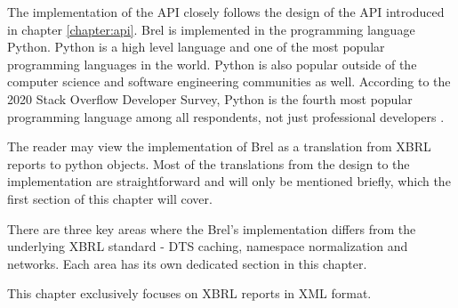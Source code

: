 The implementation of the API closely follows the design of the API introduced in chapter \ref{chapter:api}.
Brel is implemented in the programming language Python.
Python is a high level language and one of the most popular programming languages in the world.
Python is also popular outside of the computer science and software engineering communities as well.
According to the 2020 Stack Overflow Developer Survey, Python is the fourth most popular programming language among all respondents, 
not just professional developers \cite{stack_overflow_2020}.

The reader may view the implementation of Brel as a translation from XBRL reports to python objects.
Most of the translations from the design to the implementation are straightforward and will only be mentioned briefly, 
which the first section of this chapter will cover.

There are three key areas where the Brel's implementation differs from the underlying XBRL standard - DTS caching, namespace normalization and networks.
Each area has its own dedicated section in this chapter.

This chapter exclusively focuses on XBRL reports in XML format.
